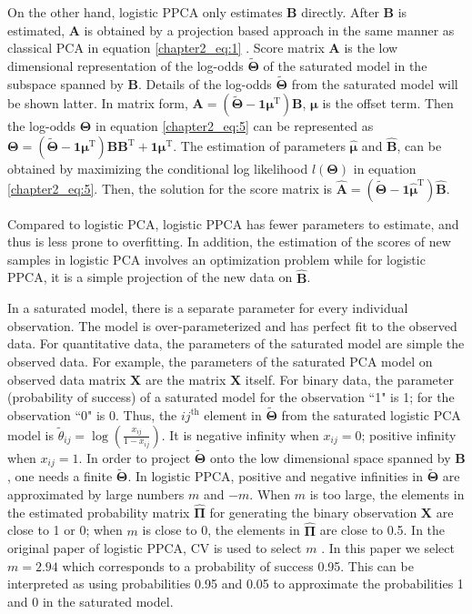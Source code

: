 On the other hand, logistic PPCA only estimates $\mathbf{B}$ directly. After $\mathbf{B}$ is estimated, $\mathbf{A}$ is obtained by a projection based approach in the same manner as classical PCA in equation \ref{chapter2_eq:1} \cite{landgraf2015generalized}. Score matrix $\mathbf{A}$ is the low dimensional representation of the log-odds $\mathbf{\widetilde{\Theta}}$ of the saturated model in the subspace spanned by $\mathbf{B}$. Details of the log-odds $\mathbf{\widetilde{\Theta}}$ from the saturated model will be shown latter. In matrix form, $\mathbf{A} = (\mathbf{\widetilde{\Theta }}-\mathbf{1}\bm{\mu}^{\text{T}})\mathbf{B}$, $\bm{\mu}$ is the offset term. Then the log-odds $\mathbf{\Theta}$ in equation \ref{chapter2_eq:5} can be represented as $\mathbf{\Theta} = (\mathbf{\widetilde{\Theta }}-\mathbf{1}\bm{\mu}^{\text{T}})\mathbf{B}\mathbf{B}^{\text{T}} + \mathbf{1}\bm{\mu}^{\text{T}}$. The estimation of parameters $\hat{\bm{\mu}}$ and $\hat{\mathbf{B}}$, can be obtained by maximizing the conditional log likelihood $l(\mathbf{\Theta})$ in equation \ref{chapter2_eq:5}. Then, the solution for the score matrix is $\hat{\mathbf{A}} = (\mathbf{\widetilde{\Theta }}-\mathbf{1}\hat{\bm{\mu}}^{\text{T}})\hat{\mathbf{B}}$.

Compared to logistic PCA, logistic PPCA has fewer parameters to estimate, and thus is less prone to overfitting. In addition, the estimation of the scores of new samples in logistic PCA involves an optimization problem while for logistic PPCA, it is a simple projection of the new data on $\hat{\mathbf{B}}$.

In a saturated model, there is a separate parameter for every individual observation. The model is over-parameterized and has perfect fit to the observed data. For quantitative data, the parameters of the saturated model are simple the observed data. For example, the parameters of the saturated PCA model on observed data matrix $\mathbf{X}$ are the matrix $\mathbf{X}$ itself. For binary data, the parameter (probability of success) of a saturated model for the observation ``1" is 1; for the observation ``0" is 0. Thus, the $ij^{\text{th}}$ element in $\mathbf{\widetilde{\Theta}}$ from the saturated logistic PCA model is $\widetilde{\theta}_{ij} = \log(\frac{x_{ij}}{1-x_{ij}})$. It is negative infinity when $x_{ij} = 0$; positive infinity when $x_{ij} = 1$. In order to project $\mathbf{\widetilde{\Theta}}$ onto the low dimensional space spanned by $\mathbf{B}$, one needs a finite $\mathbf{\widetilde{\Theta}}$. In logistic PPCA, positive and negative infinities in $\mathbf{\widetilde{\Theta}}$ are approximated by large numbers $m$ and $-m$. When $m$ is too large, the elements in the estimated probability matrix $\hat{\mathbf{\Pi}}$ for generating the binary observation $\mathbf{X}$ are close to 1 or 0; when $m$ is close to 0, the elements in $\hat{\mathbf{\Pi}}$ are close to 0.5. In the original paper of logistic PPCA, CV is used to select $m$ \cite{landgraf2015generalized}. In this paper we select $m = 2.94$ which corresponds to a probability of success 0.95. This can be interpreted as using probabilities 0.95 and 0.05 to approximate the probabilities 1 and 0 in the saturated model.

